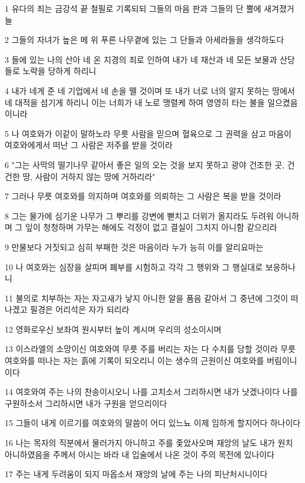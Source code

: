 \par 1 유다의 죄는 금강석 끝 철필로 기록되되 그들의 마음 판과 그들의 단 뿔에 새겨졌거늘
\par 2 그들의 자녀가 높은 메 위 푸른 나무곁에 있는 그 단들과 아세라들을 생각하도다
\par 3 들에 있는 나의 산아 네 온 지경의 죄로 인하여 내가 네 재산과 네 모든 보물과 산당들로 노략을 당하게 하리니
\par 4 내가 네게 준 네 기업에서 네 손을 뗄 것이며 또 내가 너로 너의 알지 못하는 땅에서 네 대적을 섬기게 하리니 이는 너희가 내 노로 맹렬케 하여 영영히 타는 불을 일으켰음이니라
\par 5 나 여호와가 이같이 말하노라 무릇 사람을 믿으며 혈육으로 그 권력을 삼고 마음이 여호와에게서 떠난 그 사람은 저주를 받을 것이라
\par 6 "그는 사막의 떨기나무 같아서 좋은 일의 오는 것을 보지 못하고 광야 건조한 곳, 건건한 땅, 사람이 거하지 않는 땅에 거하리라"
\par 7 그러나 무릇 여호와를 의지하며 여호와를 의뢰하는 그 사람은 복을 받을 것이라
\par 8 그는 물가에 심기운 나무가 그 뿌리를 강변에 뻗치고 더위가 올지라도 두려워 아니하며 그 잎이 청청하며 가무는 해에도 걱정이 없고 결실이 그치지 아니함 같으리라
\par 9 만물보다 거짓되고 심히 부패한 것은 마음이라 누가 능히 이를 알리요마는
\par 10 나 여호와는 심장을 살피며 폐부를 시험하고 각각 그 행위와 그 행실대로 보응하나니
\par 11 불의로 치부하는 자는 자고새가 낳지 아니한 알을 품음 같아서 그 중년에 그것이 떠나겠고 필경은 어리석은 자가 되리라
\par 12 영화로우신 보좌여 원시부터 높이 계시며 우리의 성소이시며
\par 13 이스라엘의 소망이신 여호와여 무릇 주를 버리는 자는 다 수치를 당할 것이라 무릇 여호와를 떠나는 자는 흙에 기록이 되오리니 이는 생수의 근원이신 여호와를 버림이니이다
\par 14 여호와여 주는 나의 찬송이시오니 나를 고치소서 그리하시면 내가 낫겠나이다 나를 구원하소서 그리하시면 내가 구원을 얻으리이다
\par 15 그들이 내게 이르기를 여호와의 말씀이 어디 있느뇨 이제 임하게 할지어다 하나이다
\par 16 나는 목자의 직분에서 물러가지 아니하고 주를 좇았사오며 재앙의 날도 내가 원치 아니하였음을 주께서 아시는 바라 내 입술에서 나온 것이 주의 목전에 있나이다
\par 17 주는 내게 두려움이 되지 마옵소서 재앙의 날에 주는 나의 피난처시니이다

